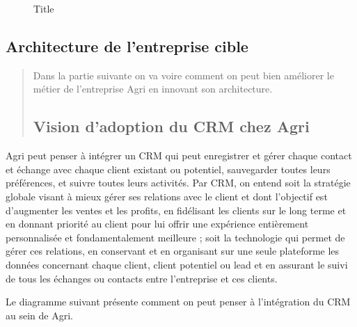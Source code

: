 \documentclass[a4paper]{report}
\begin{document}
\begin{doublespace}
\begin{figure}[H] 
	\begin{center}
		\caption{Title}
	\end{center}
\end{figure}

\subsection{Architecture de l'entreprise cible}

\begin{quote}
Dans la partie suivante on va voire comment on peut bien améliorer le
métier de l'entreprise Agri en innovant son architecture.

\subsection{Vision d'adoption du CRM chez Agri}
\end{quote}

Agri peut penser à intégrer un CRM qui peut enregistrer et gérer chaque
contact et échange avec chaque client existant ou potentiel, sauvegarder
toutes leurs préférences, et suivre toutes leurs activités. Par CRM, on
entend soit la stratégie globale visant à mieux gérer ses relations avec
le client et dont l'objectif est d'augmenter les ventes et les profits,
en fidélisant les clients sur le long terme et en donnant priorité au
client pour lui offrir une expérience entièrement personnalisée et
fondamentalement meilleure ; soit la technologie qui permet de gérer ces
relations, en conservant et en organisant sur une seule plateforme les
données concernant chaque client, client potentiel ou lead et en
assurant le suivi de tous les échanges ou contacts entre l'entreprise et
ces clients.

Le diagramme suivant présente comment on peut penser à l'intégration du
CRM au sein de Agri.


\end{doublespace}
\end{document}
